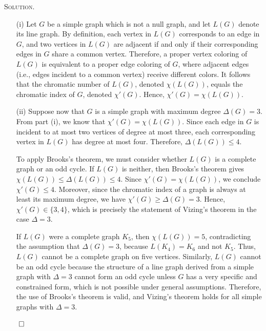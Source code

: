 \documentclass[12pt, a4paper, oneside]{ctexart}
\newenvironment{solution}{%
	\par\noindent\textsc{Solution. }\ignorespaces
}{%
	\hfill$\qed$\par
}
\begin{document}
	\begin{solution}
        \begin{enumerate}
			\item[(i)]	Let \( G \) be a simple graph which is not a null graph, and let \( L(G) \) denote 
			its line graph. By definition, each vertex in \( L(G) \) corresponds to an edge in \( G \), 
			and two vertices in \( L(G) \) are adjacent if and only if their corresponding edges in \( G \) 
			share a common vertex. Therefore, a proper vertex coloring of \( L(G) \) is equivalent to 
			a proper edge coloring of \( G \), where adjacent edges (i.e., edges incident to a common vertex) 
			receive different colors. It follows that the chromatic number of \( L(G) \), denoted \( \chi(L(G)) \), 
			equals the chromatic index of \( G \), denoted \( \chi'(G) \). Hence, \( \chi'(G) = \chi(L(G)) \).
			\item[(ii)] Suppose now that \( G \) is a simple graph with maximum degree \( \Delta(G) = 3 \). 
			From part (i), we know that \( \chi'(G) = \chi(L(G)) \). Since each edge in \( G \) is incident to 
			at most two vertices of degree at most three, each corresponding vertex in \( L(G) \) has degree 
			at most four. Therefore, \( \Delta(L(G)) \leq 4 \). 

			To apply Brooks's theorem, we must consider whether \( L(G) \) is a complete graph or an odd cycle. 
			If \( L(G) \) is neither, then Brooks's theorem gives \( \chi(L(G)) \leq \Delta(L(G)) \leq 4 \). 
			Since \( \chi'(G) = \chi(L(G)) \), we conclude \( \chi'(G) \leq 4 \). Moreover, since the chromatic 
			index of a graph is always at least its maximum degree, we have \( \chi'(G) \geq \Delta(G) = 3 \). 
			Hence, \( \chi'(G) \in \{3, 4\} \), which is precisely the statement of Vizing's theorem in the case 
			\( \Delta = 3 \).

			If \( L(G) \) were a complete graph \( K_5 \), then \( \chi(L(G)) = 5 \), contradicting the assumption 
			that \( \Delta(G) = 3 \), because \( L(K_4) = K_6 \) and not \( K_5 \). Thus, \( L(G) \) cannot be 
			a complete graph on five vertices. Similarly, \( L(G) \) cannot be an odd cycle because the structure 
			of a line graph derived from a simple graph with \( \Delta = 3 \) cannot form an odd cycle unless \( G \) 
			has a very specific and constrained form, which is not possible under general assumptions. 
			Therefore, the use of Brooks's theorem is valid, and Vizing's theorem holds for all simple graphs with 
			\( \Delta = 3 \).

		\end{enumerate}

    \end{solution}
		
\end{document}
